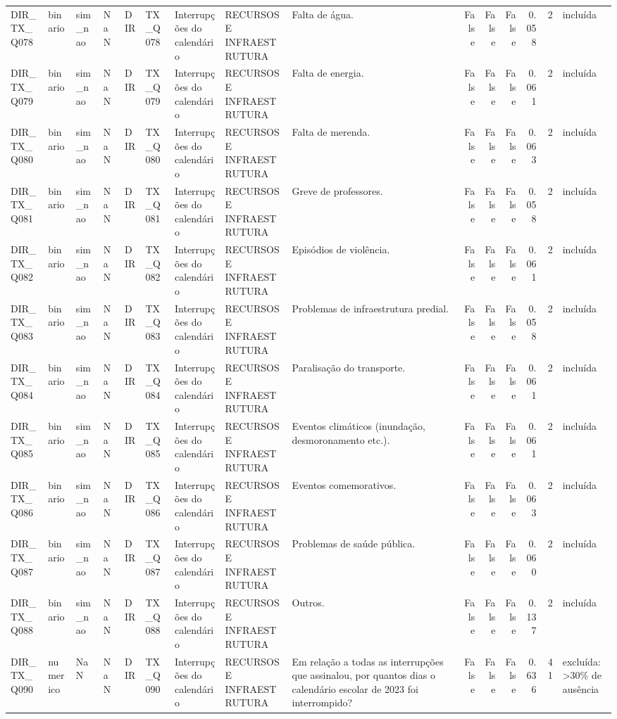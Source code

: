 \begin{tabular}{lllllllllrrrrrl}
DIR\_TX\_Q078 & binario & sim\_nao & NaN & DIR & TX\_Q078 & Interrupções do calendário & RECURSOS E INFRAESTRUTURA & Falta de água. & False & False & False & 0.058 & 2 & incluída \\
DIR\_TX\_Q079 & binario & sim\_nao & NaN & DIR & TX\_Q079 & Interrupções do calendário & RECURSOS E INFRAESTRUTURA & Falta de energia. & False & False & False & 0.061 & 2 & incluída \\
DIR\_TX\_Q080 & binario & sim\_nao & NaN & DIR & TX\_Q080 & Interrupções do calendário & RECURSOS E INFRAESTRUTURA & Falta de merenda. & False & False & False & 0.063 & 2 & incluída \\
DIR\_TX\_Q081 & binario & sim\_nao & NaN & DIR & TX\_Q081 & Interrupções do calendário & RECURSOS E INFRAESTRUTURA & Greve de professores. & False & False & False & 0.058 & 2 & incluída \\
DIR\_TX\_Q082 & binario & sim\_nao & NaN & DIR & TX\_Q082 & Interrupções do calendário & RECURSOS E INFRAESTRUTURA & Episódios de violência. & False & False & False & 0.061 & 2 & incluída \\
DIR\_TX\_Q083 & binario & sim\_nao & NaN & DIR & TX\_Q083 & Interrupções do calendário & RECURSOS E INFRAESTRUTURA & Problemas de infraestrutura predial. & False & False & False & 0.058 & 2 & incluída \\
DIR\_TX\_Q084 & binario & sim\_nao & NaN & DIR & TX\_Q084 & Interrupções do calendário & RECURSOS E INFRAESTRUTURA & Paralisação do transporte. & False & False & False & 0.061 & 2 & incluída \\
DIR\_TX\_Q085 & binario & sim\_nao & NaN & DIR & TX\_Q085 & Interrupções do calendário & RECURSOS E INFRAESTRUTURA & Eventos climáticos (inundação, desmoronamento etc.). & False & False & False & 0.061 & 2 & incluída \\
DIR\_TX\_Q086 & binario & sim\_nao & NaN & DIR & TX\_Q086 & Interrupções do calendário & RECURSOS E INFRAESTRUTURA & Eventos comemorativos. & False & False & False & 0.063 & 2 & incluída \\
DIR\_TX\_Q087 & binario & sim\_nao & NaN & DIR & TX\_Q087 & Interrupções do calendário & RECURSOS E INFRAESTRUTURA & Problemas de saúde pública. & False & False & False & 0.060 & 2 & incluída \\
DIR\_TX\_Q088 & binario & sim\_nao & NaN & DIR & TX\_Q088 & Interrupções do calendário & RECURSOS E INFRAESTRUTURA & Outros. & False & False & False & 0.137 & 2 & incluída \\
DIR\_TX\_Q090 & numerico & NaN & NaN & DIR & TX\_Q090 & Interrupções do calendário & RECURSOS E INFRAESTRUTURA & Em relação a todas as interrupções que assinalou, por quantos dias o calendário escolar de 2023 foi interrompido? & False & False & False & 0.636 & 41 & excluída: >30\% de ausência \\

\end{tabular}
